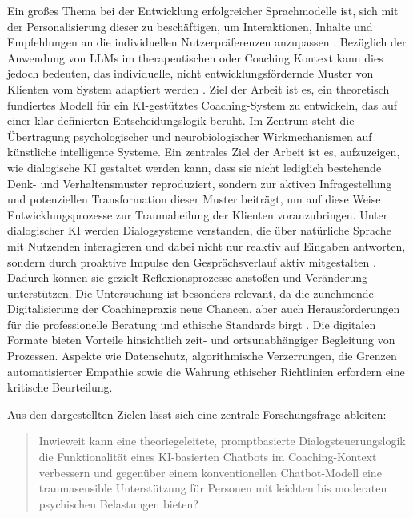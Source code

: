 Ein großes Thema bei der Entwicklung erfolgreicher Sprachmodelle ist, sich mit der Personalisierung dieser zu beschäftigen, um Interaktionen, Inhalte und Empfehlungen an die
individuellen Nutzerpräferenzen anzupassen \citep{Tan2024}. Bezüglich der Anwendung von LLMs im therapeutischen oder Coaching Kontext kann dies jedoch bedeuten, das individuelle, nicht entwicklungsfördernde Muster von Klienten vom System adaptiert werden \citep{Xiao2025Humanizing}.
Ziel der Arbeit ist es, ein theoretisch fundiertes Modell für ein KI-gestütztes
Coaching-System zu entwickeln, das auf einer klar definierten Entscheidungslogik beruht. Im
Zentrum steht die Übertragung psychologischer und neurobiologischer Wirkmechanismen
auf künstliche intelligente Systeme. Ein zentrales Ziel der Arbeit ist es, aufzuzeigen, wie dialogische KI gestaltet
werden kann, dass sie nicht lediglich bestehende Denk- und Verhaltensmuster reproduziert,
sondern zur aktiven Infragestellung und potenziellen Transformation dieser Muster beiträgt,
um auf diese Weise Entwicklungsprozesse zur Traumaheilung der Klienten voranzubringen.
Unter dialogischer KI werden Dialogsysteme verstanden, die über natürliche Sprache mit
Nutzenden interagieren und dabei nicht nur reaktiv auf Eingaben antworten, sondern durch
proaktive Impulse den Gesprächsverlauf aktiv mitgestalten \citep{Deng2025Proactive}. Dadurch können sie gezielt
Reflexionsprozesse anstoßen und Veränderung unterstützen. Die Untersuchung ist besonders relevant, da die zunehmende Digitalisierung der Coachingpraxis
neue Chancen, aber auch Herausforderungen für die professionelle Beratung und ethische
Standards birgt \citep{mai2023chatbots,passmore2023can}.
Die digitalen Formate bieten Vorteile hinsichtlich zeit- und ortsunabhängiger Begleitung von Prozessen. Aspekte wie Datenschutz, algorithmische Verzerrungen, die Grenzen automatisierter Empathie sowie die Wahrung ethischer Richtlinien erfordern eine kritische Beurteilung.


Aus den dargestellten Zielen lässt sich eine zentrale Forschungsfrage ableiten:

\begin{quote}
Inwieweit kann eine theoriegeleitete, promptbasierte Dialogsteuerungslogik die Funktionalität eines KI-basierten Chatbots im Coaching-Kontext verbessern und gegenüber einem konventionellen Chatbot-Modell eine traumasensible Unterstützung für Personen mit leichten bis moderaten psychischen Belastungen bieten?
\end{quote}


